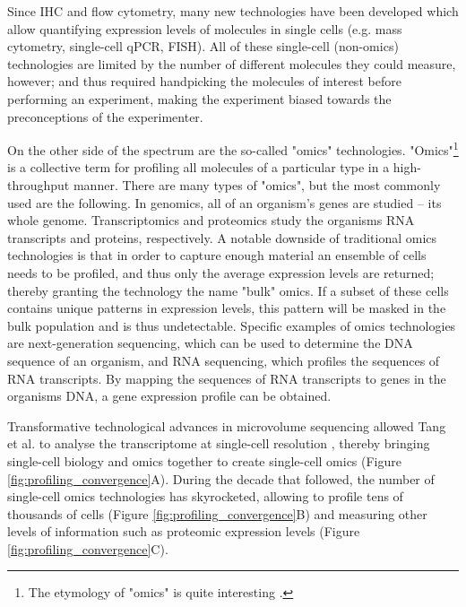 Since IHC and flow cytometry, many new technologies have been developed which allow quantifying expression levels of molecules in single cells (e.g. mass cytometry, single-cell qPCR, FISH). All of these single-cell (non-omics) technologies are limited by the number of different molecules they could measure, however; and thus required handpicking the molecules of interest before performing an experiment, making the experiment biased towards the preconceptions of the experimenter.

On the other side of the spectrum are the so-called "omics" technologies. "Omics"\footnote{The etymology of "omics" is quite interesting \cite{yadav_wholenesssuffixomics_2007}.} is a collective term for profiling all molecules of a particular type in a high-throughput manner. There are many types of "omics", but the most commonly used are the following. In genomics, all of an organism's genes are studied -- its whole genome. Transcriptomics and proteomics study the organisms RNA transcripts and proteins, respectively. A notable downside of traditional omics technologies is that in order to capture enough material an ensemble of cells needs to be profiled, and thus only the average expression levels are returned; thereby granting the technology the name "bulk" omics. If a subset of these cells contains unique patterns in expression levels, this pattern will be masked in the bulk population and is thus undetectable. Specific examples of omics technologies are next-generation sequencing, which can be used to determine the DNA sequence of an organism, and RNA sequencing, which profiles the sequences of RNA transcripts. By mapping the sequences of RNA transcripts to genes in the organisms DNA, a gene expression profile can be obtained.

Transformative technological advances in microvolume sequencing allowed Tang et al. to analyse the transcriptome at single-cell resolution \cite{tang_mrnaseqwholetranscriptomeanalysis_2009}, thereby bringing single-cell biology and omics together to create single-cell omics (Figure \ref{fig:profiling_convergence}A). During the decade that followed, the number of single-cell omics technologies has skyrocketed, allowing to profile tens of thousands of cells (Figure \ref{fig:profiling_convergence}B) and measuring other levels of information such as proteomic expression levels (Figure \ref{fig:profiling_convergence}C).

